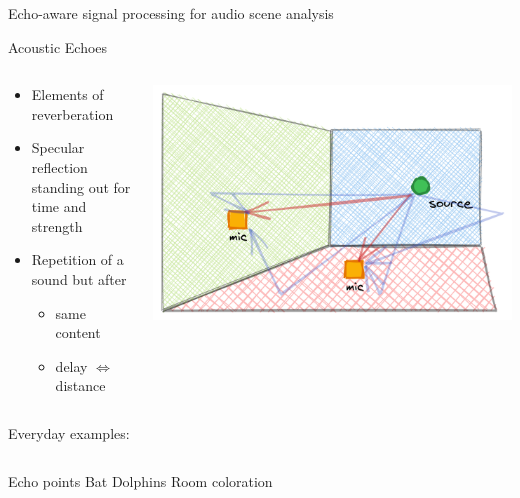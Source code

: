 \begin{frame}[t]{\alert{Echo-aware} signal processing for audio scene analysis}
\begin{mydefblock}{Acoustic Echoes}
        \vspace{-2mm}
        \begin{columns}[onlytextwidth]
            \begin{column}{0.60\textwidth}
                \begin{itemize}
                    \item Elements of reverberation
                    \item Specular reflection standing out for time and strength
                    \item Repetition of a sound but after
                    \begin{itemize}
                        \item same content
                        \item delay $\Leftrightarrow$ distance
                    \end{itemize}
                \end{itemize}
            \end{column}
            \begin{column}{0.38\textwidth}
                \centering
                \includegraphics[width=.8\textwidth]{figures/echoes}
            \end{column}

        \end{columns}
    \end{mydefblock}

    \begin{block}{Everyday examples:}

        \vspace*{2mm}
        \begin{columns}[T,onlytextwidth]
            Echo points
            Bat
            Dolphins
            Room coloration
        \end{columns}
    \end{block}



\end{frame}

